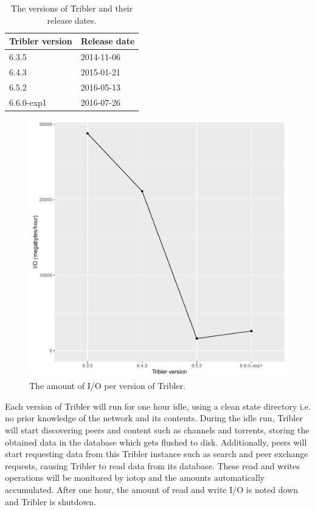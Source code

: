 \begin{table}[h]
	\centering
	\caption{The versions of Tribler and their release dates.}
	\label{table:tribler_version_dates}
	\begin{tabular}{l|l}
		\textbf{Tribler version} & \textbf{Release date} \\ \hline
		6.3.5           & 2014-11-06   \\ 
		6.4.3           & 2015-01-21   \\ 
		6.5.2           & 2016-05-13   \\ 
		6.6.0-exp1      & 2016-07-26   \\ 
	\end{tabular}
\end{table}

\begin{figure}[!h]
	\centering
	\includegraphics[width=\linewidth]{experimentation/images/io_history}
	\caption{The amount of I/O per version of Tribler.}
	\label{fig:io_history}
\end{figure} 

Each version of Tribler will run for one hour idle, using a clean state directory i.e. no prior knowledge of the network and its contents.
During the idle run, Tribler will start discovering peers and content such as channels and torrents, storing the obtained data in the database which gets flushed to disk.
Additionally, peers will start requesting data from this Tribler instance such as search and peer exchange requests, causing Tribler to read data from its database.
These read and writes operations will be monitored by iotop and the amounts automatically accumulated.
After one hour, the amount of read and write I/O is noted down and Tribler is shutdown.

